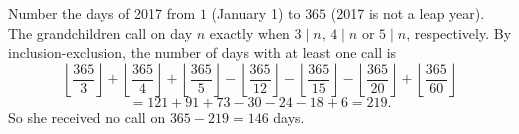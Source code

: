 Number the days of 2017 from $1$ (January 1) to $365$ (2017 is not a leap year). The grandchildren call on day $n$ exactly when $3\mid n$, $4\mid n$ or $5\mid n$, respectively. By inclusion-exclusion, the number of days with at least one call is
\[\left\lfloor\dfrac{365}{3}\right\rfloor+\left\lfloor\dfrac{365}{4}\right\rfloor+\left\lfloor\dfrac{365}{5}\right\rfloor-\left\lfloor\dfrac{365}{12}\right\rfloor-\left\lfloor\dfrac{365}{15}\right\rfloor-\left\lfloor\dfrac{365}{20}\right\rfloor+\left\lfloor\dfrac{365}{60}\right\rfloor\]
\[=121+91+73-30-24-18+6=219.\]
So she received no call on $365-219=\boxed{146}$ days.
